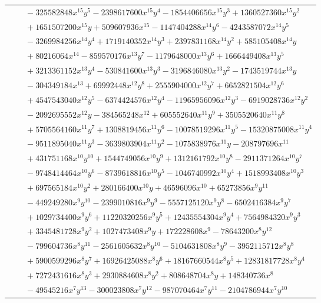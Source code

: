 \documentclass[11pt]{article}
\begin{document}
\begin{longtable}{@{}ll@{}}
 & $\quad -325582848x^{15}y^{5}-2398617600x^{15}y^{4}-1854406656x^{15}y^{3}+1360527360x^{15}y^{2}$\\
 & $\quad +1651507200x^{15}y+509607936x^{15}-1147404288x^{14}y^{6}-4243587072x^{14}y^{5}$\\
 & $\quad -3269984256x^{14}y^{4}+1719140352x^{14}y^{3}+2397831168x^{14}y^{2}+585105408x^{14}y$\\
 & $\quad +80216064x^{14}-859570176x^{13}y^{7}-1179648000x^{13}y^{6}+1666449408x^{13}y^{5}$\\
 & $\quad +3213361152x^{13}y^{4}-530841600x^{13}y^{3}-3196846080x^{13}y^{2}-1743519744x^{13}y$\\
 & $\quad -304349184x^{13}+69992448x^{12}y^{8}+2555904000x^{12}y^{7}+6652821504x^{12}y^{6}$\\
 & $\quad +4547543040x^{12}y^{5}-6374424576x^{12}y^{4}-11965956096x^{12}y^{3}-6919028736x^{12}y^{2}$\\
 & $\quad -2092695552x^{12}y-384565248x^{12}+605552640x^{11}y^{9}+3505520640x^{11}y^{8}$\\
 & $\quad +5705564160x^{11}y^{7}+1308819456x^{11}y^{6}-10078519296x^{11}y^{5}-15320875008x^{11}y^{4}$\\
 & $\quad -9511895040x^{11}y^{3}-3639803904x^{11}y^{2}-1075838976x^{11}y-208797696x^{11}$\\
 & $\quad +431751168x^{10}y^{10}+1544749056x^{10}y^{9}+1312161792x^{10}y^{8}-2911371264x^{10}y^{7}$\\
 & $\quad -9748414464x^{10}y^{6}-8739618816x^{10}y^{5}-1046740992x^{10}y^{4}+1518993408x^{10}y^{3}$\\
 & $\quad +697565184x^{10}y^{2}+280166400x^{10}y+46596096x^{10}+65273856x^{9}y^{11}$\\
 & $\quad -449249280x^{9}y^{10}-2399010816x^{9}y^{9}-5557125120x^{9}y^{8}-6502416384x^{9}y^{7}$\\
 & $\quad +1029734400x^{9}y^{6}+11220320256x^{9}y^{5}+12435554304x^{9}y^{4}+7564984320x^{9}y^{3}$\\
 & $\quad +3345481728x^{9}y^{2}+1027473408x^{9}y+172228608x^{9}-78643200x^{8}y^{12}$\\
 & $\quad -799604736x^{8}y^{11}-2561605632x^{8}y^{10}-5104631808x^{8}y^{9}-3952115712x^{8}y^{8}$\\
 & $\quad +5900599296x^{8}y^{7}+16926425088x^{8}y^{6}+18167660544x^{8}y^{5}+12831817728x^{8}y^{4}$\\
 & $\quad +7272431616x^{8}y^{3}+2930884608x^{8}y^{2}+808648704x^{8}y+148340736x^{8}$\\
 & $\quad -49545216x^{7}y^{13}-300023808x^{7}y^{12}-987070464x^{7}y^{11}-2104786944x^{7}y^{10}$\\

\end{longtable}
\end{document}
